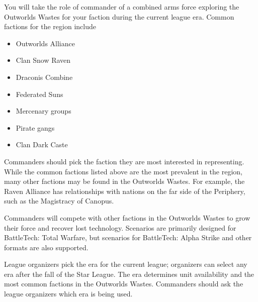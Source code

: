 You will take the role of commander of a combined arms force exploring the Outworlds Wastes for your faction during the current league era.
Common factions for the region include


\begin{itemize}

\item Outworlds Alliance

\item Clan Snow Raven

\item Draconis Combine

\item Federated Suns

\item Mercenary groups

\item Pirate gangs

\item Clan Dark Caste


\end{itemize}


Commanders should pick the faction they are most interested in representing.
While the common factions listed above are the most prevalent in the region, many other factions may be found in the Outworlds Wastes.
For example, the Raven Alliance has relationships with nations on the far side of the Periphery, such as the Magistracy of Canopus.

Commanders will compete with other factions in the Outworlds Wastes to grow their force and recover lost technology.
Scenarios are primarily designed for BattleTech: Total Warfare, but scenarios for BattleTech: Alpha Strike and other formats are also supported.

League organizers pick the era for the current league; organizers can select any era after the fall of the Star League.
The era determines unit availability and the most common factions in the Outworlds Wastes.
Commanders should ask the league organizers which era is being used.
